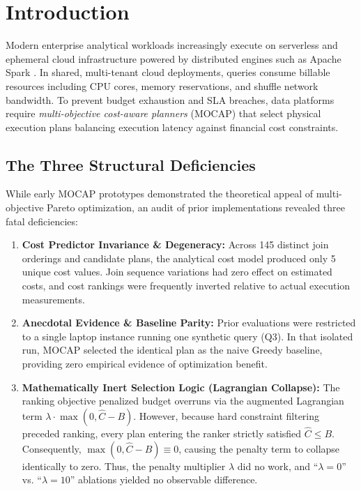\documentclass[journal,10pt,onecolumn]{article}
\begin{document}
\section{Introduction}
\label{sec:intro}

Modern enterprise analytical workloads increasingly execute on serverless and ephemeral cloud infrastructure powered by distributed engines such as Apache Spark \cite{armbrust2015spark}. In shared, multi-tenant cloud deployments, queries consume billable resources including CPU cores, memory reservations, and shuffle network bandwidth. To prevent budget exhaustion and SLA breaches, data platforms require \emph{multi-objective cost-aware planners} (MOCAP) that select physical execution plans balancing execution latency against financial cost constraints.

\subsection{The Three Structural Deficiencies}
While early MOCAP prototypes demonstrated the theoretical appeal of multi-objective Pareto optimization, an audit of prior implementations revealed three fatal deficiencies:

\begin{enumerate}
    \item \textbf{Cost Predictor Invariance \& Degeneracy:} Across 145 distinct join orderings and candidate plans, the analytical cost model produced only 5 unique cost values. Join sequence variations had zero effect on estimated costs, and cost rankings were frequently inverted relative to actual execution measurements.
    \item \textbf{Anecdotal Evidence \& Baseline Parity:} Prior evaluations were restricted to a single laptop instance running one synthetic query (Q3). In that isolated run, MOCAP selected the identical plan as the naive Greedy baseline, providing zero empirical evidence of optimization benefit.
    \item \textbf{Mathematically Inert Selection Logic (Lagrangian Collapse):} The ranking objective penalized budget overruns via the augmented Lagrangian term $\lambda \cdot \max(0, \hat{C} - B)$. However, because hard constraint filtering preceded ranking, every plan entering the ranker strictly satisfied $\hat{C} \le B$. Consequently, $\max(0, \hat{C} - B) \equiv 0$, causing the penalty term to collapse identically to zero. Thus, the penalty multiplier $\lambda$ did no work, and ``$\lambda = 0$'' vs. ``$\lambda = 10$'' ablations yielded no observable difference.
\end{enumerate}
\end{document}
